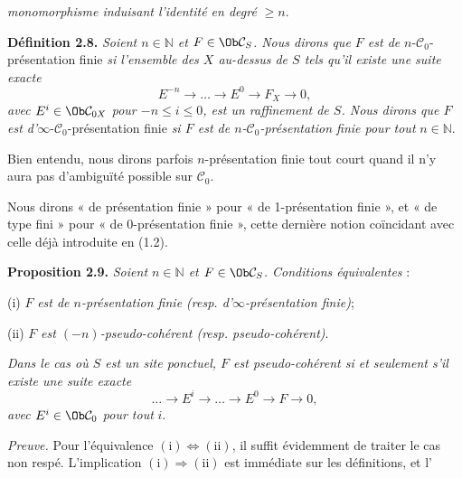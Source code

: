 \emph{monomorphisme induisant l'identité en degré} \(\geq n\).

\textbf{Définition 2.8.} \emph{Soient \(n\in\mathbb N\) et \(F\in\Ob\mathcal C_S\). Nous dirons que \(F\) est de} \(n\)-\(\mathcal C_0\)-présentation finie \emph{si l'ensemble des \(X\) au-dessus de \(S\) tels qu'il existe une suite exacte}
\[
  E^{-n}\longrightarrow\ldots\longrightarrow E^0\longrightarrow F_X\longrightarrow 0,
\]
\emph{avec \(E^i\in\Ob\mathcal C_{0X}\) pour \(-n\leq i\leq 0\), est un raffinement de \(S\). Nous dirons que \(F\) est d'}\(\infty\)-\(\mathcal C_0\)-présentation finie \emph{si \(F\) est de \(n\)-\(\mathcal C_0\)-présentation finie pour tout} \(n\in\mathbb N\).

Bien entendu, nous dirons parfois \(n\)-présentation finie tout court quand il n'y aura pas d'ambiguïté possible sur \(\mathcal C_0\).

Nous dirons « de présentation finie » pour « de 1-présentation finie », et « de type fini » pour « de 0-présentation finie », cette dernière notion coïncidant avec celle déjà introduite en (1.2).

\textbf{Proposition 2.9.} \emph{Soient \(n\in\mathbb N\) et \(F\in\Ob\mathcal C_S\). Conditions équivalentes} :

(i) \(F\) \emph{est de \(n\)-présentation finie (resp. d'\(\infty\)-présentation finie)};

(ii) \(F\) \emph{est \((-n)\)-pseudo-cohérent (resp. pseudo-cohérent)}.

\emph{Dans le cas où \(S\) est un site ponctuel, \(F\) est pseudo-cohérent si et seulement s'il existe une suite exacte}
\[
  \ldots\longrightarrow E^i\longrightarrow\ldots\longrightarrow E^0\longrightarrow F\longrightarrow 0,
\]
\emph{avec \(E^i\in\Ob\mathcal C_0\) pour tout} \(i\).

\emph{Preuve.} Pour l'équivalence \((\mathrm{i})\Leftrightarrow(\mathrm{ii})\), il suffit évidemment de traiter le cas non respé. L'implication \((\mathrm{i})\Rightarrow(\mathrm{ii})\) est immédiate sur les définitions, et l'%
